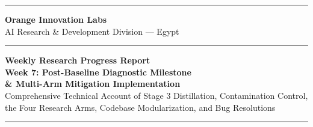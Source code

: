 \documentclass[12pt, a4paper]{article}
\begin{document}
\begin{titlepage}
  \pagecolor{DarkBG}
  \color{white}
  \begin{center}
    \vspace*{0.8cm}
    
    {\color{OrangeMain}\rule{\textwidth}{3pt}}
    \vspace{0.4cm}
    
    {\Large\bfseries\color{OrangeLight} Orange Innovation Labs}\\[0.2cm]
    {\normalsize\color{MidGray} AI Research \& Development Division --- Egypt}
    
    \vspace{0.6cm}
    {\color{OrangeMain}\rule{0.4\textwidth}{1pt}}
    \vspace{0.6cm}
    
    {\Huge\bfseries\color{white}
      Weekly Research Progress Report\\[0.3cm]
      \color{OrangeMain} Week 7: Post-Baseline Diagnostic Milestone\\
      \color{white} \& Multi-Arm Mitigation Implementation}\\[0.4cm]
    
    {\large\color{LightGray}
      Comprehensive Technical Account of Stage 3 Distillation, Contamination Control,\\
      the Four Research Arms, Codebase Modularization, and Bug Resolutions}
    
    \vspace{0.8cm}
    {\color{OrangeMain}\rule{0.4\textwidth}{1pt}}
    \vspace{0.8cm}
    

\end{center}
\end{titlepage}
\end{document}
